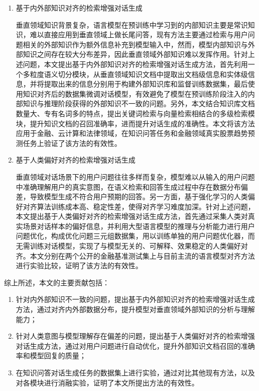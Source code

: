 \begin{enumerate}[topsep = 0 pt, itemsep= 0 pt, parsep=0pt, partopsep=0pt, leftmargin=0pt, itemindent=44pt, labelsep=6pt, listparindent=24pt, label=\arabic*)]
	\item 基于内外部知识对齐的检索增强对话生成
	
	垂直领域知识背景复杂，语言模型在预训练中学习到的内部知识主要是常识知识，难以直接应用到垂直领域上做长尾问答，现有方法主要通过检索与用户问题相关的外部知识作为额外信息补充到模型输入中，然而，模型内部知识与外部知识之间存在较大分布差异，因此垂直领域外部知识难以发挥作用。针对上述问题，本文提出基于内外部知识对齐的检索增强对话生成方法，首先利用一个多粒度语义切分模块，从垂直领域知识文档中提取出文档级信息和实体级信息，并将提取出来的信息分别用于构建外部知识库和监督训练数据集，最后使用知识对齐后的数据集微调对话模型，有效避免了模型在预训练阶段注入的内部知识与推理阶段获得的外部知识不一致的问题。另外，本文结合知识库文档数量大、专有名词多的特点，提出关键词检索与向量检索相结合的多级检索模块，提升知识文档的召回准确率，进而提升对话生成的准确性。本文将该方法应用于金融、云计算和法律领域，在知识问答任务和金融领域真实股票趋势预测任务上验证了该方法的有效性。

	\item 基于人类偏好对齐的检索增强对话生成
	
	垂直领域对话场景下的用户问题往往多样而复杂，模型难以从输入的用户问题中准确理解用户的真实意图，在语义检索和回答生成过程中存在数据分布偏差，导致模型生成不符合用户预期的回答。另一方面，基于强化学习的人类偏好对齐算法训练成本高、稳定性差，使得对齐学习难度加深。针对上述问题，本文提出基于人类偏好对齐的检索增强对话生成方法，首先通过采集人类对真实场景对话样本的偏好信息，并利用大型语言模型的推理与分析能力进行用户问题优化，构成优化问题三元组数据集，用以训练单独的用户问题优化器，而无需训练对话模型，实现了与模型无关的、可解释、效果稳定的人类偏好对齐。本文分别在两个公开的金融基准测试集上与目前主流的语言模型对齐方法进行实验比较，证明了该方法的有效性。
\end{enumerate}

综上所述，本文的主要贡献包括：

\begin{enumerate}[topsep = 0 pt, itemsep= 0 pt, parsep=0pt, partopsep=0pt, leftmargin=0pt, itemindent=44pt, labelsep=6pt, listparindent=24pt, label=\arabic*)]
	\item 针对内外部知识不一致的问题，提出基于内外部知识对齐的检索增强对话生成方法，通过对齐内外部数据分布，提升模型对垂直领域外部知识的分析与理解能力；
	\item 针对人类意图与模型理解存在偏差的问题，提出基于人类偏好对齐的检索增强对话生成方法，通过对用户问题进行自动优化，提升外部知识文档召回的准确率和模型回复的质量；
	\item 在知识问答对话生成任务的数据集上进行实验，通过对比其他现有方法，以及对各模块进行消融实验，证明了本文所提出方法的有效性。
\end{enumerate}

